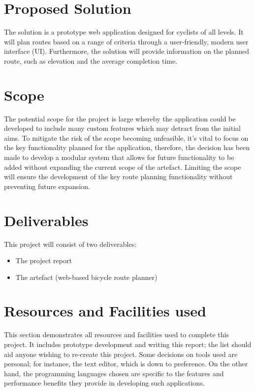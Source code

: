 \section{Proposed Solution}
\label{intro:proposedsolution}

The solution is a prototype web application designed for cyclists of all levels. It will plan routes based on a range of criteria through a user-friendly, modern user interface (UI). Furthermore, the solution will provide information on the planned route, such as elevation and the average completion time.

\section{Scope}
\label{intro:scope}

The potential scope for the project is large whereby the application could be developed to include many custom features which may detract from the initial aims. To mitigate the risk of the scope becoming unfeasible, it's vital to focus on the key functionality planned for the application, therefore, the decision has been made to develop a modular system that allows for future functionality to be added without expanding the current scope of the artefact. Limiting the scope will ensure the development of the key route planning functionality without preventing future expansion.

\section{Deliverables}
\label{intro:deliverables}

This project will consist of two deliverables:
\begin{itemize}
    \item The project report
    \item The artefact (web-based bicycle route planner)
\end{itemize}

\section{Resources and Facilities used}
\label{intro:resourcesandfacilities}

This section demonstrates all resources and facilities used to complete this project. It includes prototype development and writing this report; the list should aid anyone wishing to re-create this project. Some decisions on tools used are personal; for instance, the text editor, which is down to preference. On the other hand, the programming languages chosen are specific to the features and performance benefits they provide in developing such applications.

